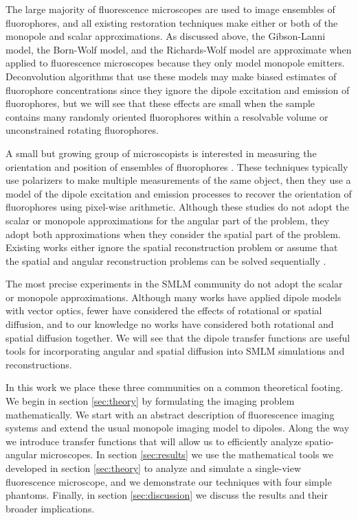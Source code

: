 \documentclass[]{osa-article}
\begin{document}
The large majority of fluorescence microscopes are used to image ensembles of
fluorophores, and all existing restoration techniques make either or both of the
monopole and scalar approximations. As discussed above, the Gibson-Lanni model,
the Born-Wolf model, and the Richards-Wolf model are approximate when applied to
fluorescence microscopes because they only model monopole emitters.
Deconvolution algorithms that use these models may make biased estimates of
fluorophore concentrations since they ignore the dipole excitation and emission
of fluorophores, but we will see that these effects are small when the sample
contains many randomly oriented fluorophores within a resolvable volume or
unconstrained rotating fluorophores.

A small but growing group of microscopists is interested in measuring the
orientation and position of ensembles of fluorophores \cite{vrabioiu2006,
  mattheyses2010, mehta2016, mcquilken2017, zhanghao2017}. These techniques
typically use polarizers to make multiple measurements of the same object, then
they use a model of the dipole excitation and emission processes
\cite{fourkas2001} to recover the orientation of fluorophores using pixel-wise
arithmetic. Although these studies do not adopt the scalar or monopole
approximations for the angular part of the problem, they adopt both
approximations when they consider the spatial part of the problem. Existing
works either ignore the spatial reconstruction problem \cite{vrabioiu2006,
  mattheyses2010, mehta2016, mcquilken2017} or assume that the spatial and
angular reconstruction problems can be solved sequentially
\cite{zhanghao2017}.

The most precise experiments in the SMLM community do not adopt the scalar or
monopole approximations. Although many works have applied dipole models with
vector optics, fewer have considered the effects of rotational or spatial
diffusion, and to our knowledge no works have considered both rotational and
spatial diffusion together. We will see that the dipole transfer functions are
useful tools for incorporating angular and spatial diffusion into SMLM
simulations and reconstructions.

In this work we place these three communities on a common theoretical footing.
We begin in section \ref{sec:theory} by formulating the imaging problem
mathematically. We start with an abstract description of fluorescence imaging
systems and extend the usual monopole imaging model to dipoles. Along the way we
introduce transfer functions that will allow us to efficiently analyze
spatio-angular microscopes. In section \ref{sec:results} we use the mathematical
tools we developed in section \ref{sec:theory} to analyze and simulate a
single-view fluorescence microscope, and we demonstrate our techniques with four
simple phantoms. Finally, in section \ref{sec:discussion} we discuss the results
and their broader implications.
\end{document}
